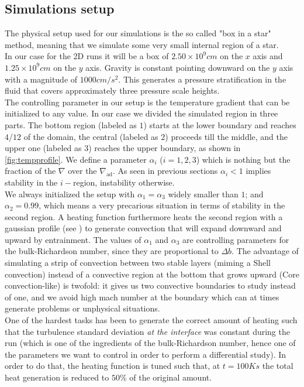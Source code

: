 \subsection{Simulations setup}
The physical setup used for our simulations is the so called "box in a star" method, meaning that we simulate some very small internal region of a star. \\
In our case for the 2D runs it will be a box of $2.50 \times 10^{9} cm$ on the $x$ axis and $1.25 \times 10^{9} cm$ on the $y$ axis. Gravity is constant pointing downward on the $y$ axis with a magnitude of $1000 cm/s^2$. This generates a pressure stratification in the fluid that covers approximately three pressure scale heights. \\
The controlling parameter in our setup is the temperature gradient that can be initialized to any value. In our case we divided the simulated region in three parts. The bottom region (labeled as $1$) starts at the lower boundary and reaches $4/12$ of the domain, the central (labeled as $2$) proceeds till the middle, and the upper one (labeled as $3$) reaches the upper boundary, as shown in \ref{fig:tempprofile}. We define a parameter $\alpha_{i}$ ($i=1, 2, 3$) which is nothing but the fraction of the $\nabla$ over the $\nabla_{\mathrm{ad}}$. As seen in previous sections $\alpha_{i}<1$ implies stability in the $i-$region, instability otherwise. \\
We always initialized the setup with $\alpha_{1} = \alpha_{3}$ widely smaller than $1$; and $\alpha_{2}=0.99$, which means a very precarious situation in terms of stability in the second region. A heating function furthermore heats the second region with a gaussian profile (see \label{fig:tempprofile}) to generate convection that will expand downward and upward by entrainment. The values of $\alpha_{1}$ and $\alpha_{3}$ are controlling parameters for the bulk-Richardson number, since they are proportional to $\Delta b$. The advantage of simulating a strip of convection between two stable layers (miming a Shell convection) instead of a convective region at the bottom that grows upward (Core convection-like) is twofold: it gives us two convective boundaries to study instead of one, and we avoid high mach number at the boundary which can at times generate problems or unphysical situations. \\
One of the hardest tasks has been to generate the correct amount of heating such that the turbulence standard deviation \textit{at the interface} was constant during the run (which is one of the ingredients of the bulk-Richardson number, hence one of the parameters we want to control in order to perform a differential study). In order to do that, the heating function is tuned such that, at $t=100K s$ the total heat generation is reduced to $50 \%$ of the original amount.\\ 
